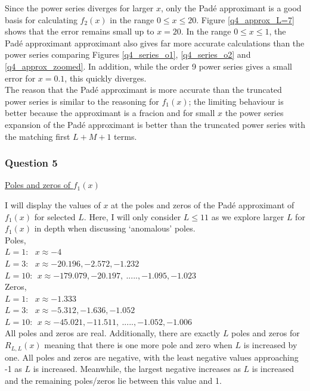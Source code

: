 \documentclass[12pt, a4paper]{article}
\begin{document}
Since the power series diverges for larger $x$, only the Pad\'e approximant is a good basis
for calculating $f_{2}(x)$ in the range $0 \leq x \leq 20$. Figure \ref{q4_approx_L=7} shows
that the error remains small up to $x=20$. In the range $0 \leq x \leq 1$, the Pad\'e approximant
approximant also gives far more accurate calculations than the power series comparing Figures
\ref{q4_series_o1}, \ref{q4_series_o2} and \ref{q4_approx_zoomed}. In addition, while the order 9
power series gives a small error for $x = 0.1$, this quickly diverges.
\\

The reason that the Pad\'e approximant is more accurate than the truncated power series is similar
to the reasoning for $f_{1}(x)$; the limiting behaviour is better because the approximant 
is a fracion and for small $x$ the power series expansion of the Pad\'e approximant is better
than the truncated power series with the matching first $L + M + 1$ terms.

\subsubsection*{Question 5}

\underline{Poles and zeros of $f_{1}(x)$}

\vspace{0.5cm}
I will display the values of $x$ at the poles and zeros of the Pad\'e approximant of $f_{1}(x)$ for 
selected $L$. Here, I will only consider $L\leq11$ as we explore larger $L$ for $f_{1}(x)$ in depth
when discussing `anomalous' poles.\\

Poles,\\
$L = 1: ~~~ x \approx -4$\\
$L = 3: ~~~ x \approx -20.196, -2.572, -1.232$\\
$L = 10: ~~ x \approx -179.079, -20.197,~....., -1.095, -1.023$\\

Zeros,\\
$L = 1: ~~~ x \approx -1.333$\\ 
$L = 3: ~~~ x \approx -5.312, -1.636, -1.052$\\
$L = 10: ~~ x \approx -45.021, -11.511,~.....,  -1.052, -1.006$
\\

All poles and zeros are real. Additionally, there are exactly $L$ poles and zeros for $R_{L,L}(x)$ meaning
that there is one more pole and zero when $L$ is increased by one. All poles and zeros are negative, with
the least negative values approaching -1 as $L$ is increased. Meanwhile, the largest negative increases as
$L$ is increased and the remaining poles/zeros lie between this value and 1.
\\
\end{document}

